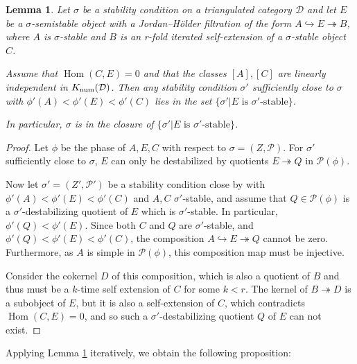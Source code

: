 \documentclass[12pt]{amsart}
\newtheorem{lemma}[theorem]{Lemma}
\theoremstyle{definition}
\DeclareMathOperator{\Hom}{Hom}
\DeclareMathOperator{\num}{num}
\begin{document}
\begin{lemma}\label{dual of 5.9}
Let $\sigma$ be a stability condition on a triangulated category $\mathcal{D}$ 
and let $E$ be a $\sigma$-semistable object with a Jordan--Hölder filtration of the form $A \hookrightarrow E \twoheadrightarrow B$,
where $A$ is $\sigma$-stable and $B$ is an r-fold iterated self-extension of a $\sigma$-stable object $C$.

Assume that $\Hom(C,E)=0$ and that the classes $[A],[C]$ are linearly independent in ${\rm K}_{\num}(\mathcal{D})$.
Then any stability condition $\sigma'$ sufficiently close to $\sigma$ with $\phi'(A)<\phi'(E)<\phi'(C)$ lies in the set $\{\sigma'  |  E \text{ is } \sigma' \text{-stable} \}$.

In particular, $\sigma$ is in the closure of $\{\sigma'  |  E \text{ is } \sigma' \text{-stable} \}$.
\end{lemma}
\begin{proof}
Let $\phi$ be the phase of $A,E,C$ with respect to $\sigma=(Z,\mathcal{P})$.
For $\sigma'$ sufficiently close to $\sigma$, 
$E$ can only be destabilized by quotients $E \twoheadrightarrow Q$ in $\mathcal{P}(\phi)$.

Now let $\sigma'=(Z',\mathcal{P}')$ be a stability condition close by with $\phi'(A)<\phi'(E)<\phi'(C)$ and $A,C$ $\sigma'$-stable,
and assume that $Q \in \mathcal{P}(\phi)$ is a $\sigma'$-destabilizing quotient of $E$ which is $\sigma'$-stable.
In particular, $\phi'(Q)<\phi'(E)$.
Since both $C$ and $Q$ are $\sigma'$-stable, 
and $\phi'(Q)<\phi'(E)<\phi'(C)$,
the composition $A\hookrightarrow E \twoheadrightarrow Q$ cannot be zero.
Furthermore, as $A$ is simple in $\mathcal{P}(\phi)$,
this composition map must be injective.

Consider the cokernel $D$ of this composition,
which is also a quotient of $B$ and thus must be a $k$-time self extension of $C$ for some $k<r$.
The kernel of $B \twoheadrightarrow D$ is a subobject of $E$, 
but it is also a self-extension of $C$,
which contradicts $\Hom(C,E)=0$,
and so such a $\sigma'$-destabilizing quotient $Q$ of $E$ can not exist.
\end{proof} 

Applying Lemma \ref{dual of 5.9} iteratively, we obtain the following proposition:
\end{document}
